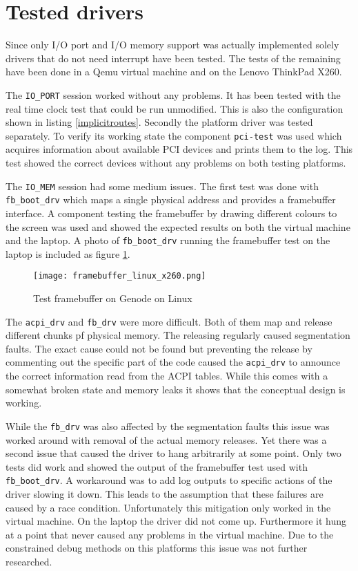 \documentclass[
a4paper,
12pt,
notitlepage,
parskip=half,
DIV=11,
]{scrbook}
\begin{document}
		\section{Tested drivers}
		
		Since only I/O port and I/O memory support was actually implemented solely drivers that do not need interrupt have been tested.
		The tests of the remaining have been done in a Qemu virtual machine and on the Lenovo ThinkPad X260.
		
		The \texttt{IO\_PORT} session worked without any problems.
		It has been tested with the real time clock test that could be run unmodified.
		This is also the configuration shown in listing \ref{implicitroutes}.
		Secondly the platform driver was tested separately.
		To verify its working state the component \texttt{pci-test} was used which acquires information about available PCI devices and prints them to the log.
		This test showed the correct devices without any problems on both testing platforms.
		
		The \texttt{IO\_MEM} session had some medium issues.
		The first test was done with \texttt{fb\_boot\_drv} which maps a single physical address and provides a framebuffer interface.
		A component testing the framebuffer by drawing different colours to the screen was used and showed the expected results on both the virtual machine and the laptop.
		A photo of \texttt{fb\_boot\_drv} running the framebuffer test on the laptop is included as figure \ref{testfbx260}.

		\begin{figure}
			\centering
			\texttt{[image: framebuffer\_linux\_x260.png]}
			\caption{Test framebuffer on Genode on Linux}
			\label{testfbx260}
		\end{figure}		
		
		The \texttt{acpi\_drv} and \texttt{fb\_drv} were more difficult.
		Both of them map and release different chunks pf physical memory.
		The releasing regularly caused segmentation faults.
		The exact cause could not be found but preventing the release by commenting out the specific part of the code caused the \texttt{acpi\_drv} to announce the correct information read from the ACPI tables.
		While this comes with a somewhat broken state and memory leaks it shows that the conceptual design is working.
		
		While the \texttt{fb\_drv} was also affected by the segmentation faults this issue was worked around with removal of the actual memory releases.
		Yet there was a second issue that caused the driver to hang arbitrarily at some point.
		Only two tests did work and showed the output of the framebuffer test used with \texttt{fb\_boot\_drv}.
		A workaround was to add log outputs to specific actions of the driver slowing it down.
		This leads to the assumption that these failures are caused by a race condition.
		Unfortunately this mitigation only worked in the virtual machine.
		On the laptop the driver did not come up.
		Furthermore it hung at a point that never caused any problems in the virtual machine.
		Due to the constrained debug methods on this platforms this issue was not further researched.
		
\end{document}

